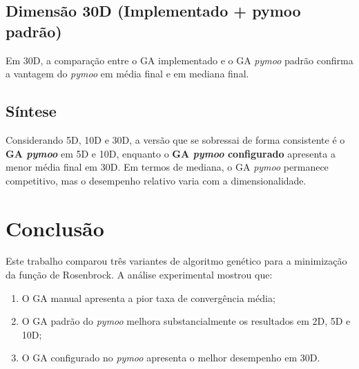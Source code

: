\documentclass[runningheads]{llncs}
\begin{document}
\subsection{Dimensão 30D (Implementado + pymoo padrão)}

Em 30D, a comparação entre o GA implementado e o GA \textit{pymoo} padrão confirma a vantagem do \textit{pymoo} em média final e em mediana final.

\begin{table}[H]
\centering
\caption{Resumo estatístico final em 30D (30 execuções): GA implementado e GA \textit{pymoo}.}
\label{tab:resumo_30d_2}
\small
\setlength{\tabcolsep}{3pt}
\end{table}

\subsection{Síntese}
Considerando 5D, 10D e 30D, a versão que se sobressai de forma consistente é o \textbf{GA \textit{pymoo}} em 5D e 10D, enquanto o \textbf{GA \textit{pymoo} configurado} apresenta a menor média final em 30D. Em termos de mediana, o GA \textit{pymoo} permanece competitivo, mas o desempenho relativo varia com a dimensionalidade.

\section{Conclusão}
Este trabalho comparou três variantes de algoritmo genético para a minimização da função de Rosenbrock. A análise experimental mostrou que:
\begin{enumerate}
\item O GA manual apresenta a pior taxa de convergência média;
\item O GA padrão do \textit{pymoo} melhora substancialmente os resultados em 2D, 5D e 10D;
\item O GA configurado no \textit{pymoo} apresenta o melhor desempenho em 30D.
\end{enumerate}
\end{document}
